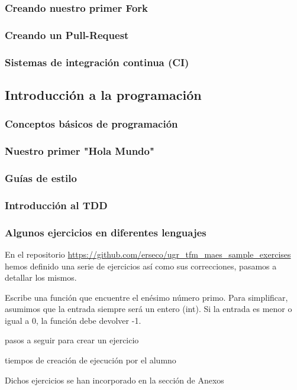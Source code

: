 \subsubsection{Creando nuestro primer Fork}


\subsubsection{Creando un Pull-Request}


\subsubsection{Sistemas de integración continua (CI)}

\subsection{Introducción a la programación}

\subsubsection{Conceptos básicos de programación}
\subsubsection{Nuestro primer "Hola Mundo"}
\subsubsection{Guías de estilo}
\subsubsection{Introducción al TDD}
\subsubsection{Algunos ejercicios en diferentes lenguajes}

En el repositorio \url{https://github.com/erseco/ugr_tfm_maes_sample_exercises} hemos definido una serie de ejercicios así como sus correcciones, pasamos a detallar los mismos.


Escribe una función que encuentre el enésimo número primo. Para simplificar, asumimos que la entrada siempre será un entero (int). Si la entrada es menor o igual a 0, la función debe devolver -1.

pasos a seguir para crear un ejercicio

tiempos de creación de ejecución por el alumno

Dichos ejercicios se han incorporado en la sección de Anexos